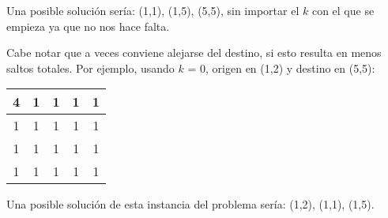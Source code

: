Una posible solución sería: (1,1), (1,5), (5,5), sin importar el $k$ con el que se empieza ya que no nos hace falta.

Cabe notar que a veces conviene alejarse del destino, si esto resulta en menos saltos totales. Por ejemplo, usando $k$ = 0, origen en (1,2) y destino en (5,5):
\begin{center}
\begin{tabular}{|c|c|c|c|c|}
\hline
 4 & 1 & 1 & 1 & 1 \\
 \hline
 1 & 1 & 1 & 1 & 1 \\
 \hline
 1 & 1 & 1 & 1 & 1 \\
 \hline
 1 & 1 & 1 & 1 & 1 \\
 \hline
\end{tabular}
\end{center}

Una posible solución de esta instancia del problema sería: (1,2), (1,1), (1,5).